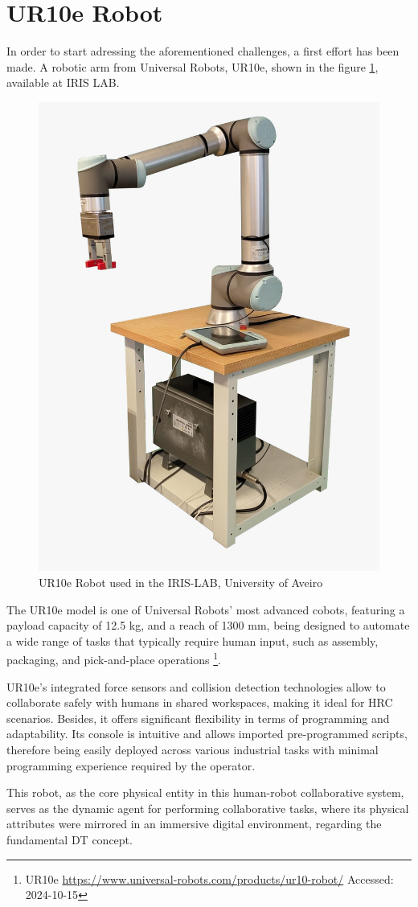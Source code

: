 \section{UR10e Robot}

In order to start adressing the aforementioned challenges, a first effort has been made. A robotic arm from Universal Robots, UR10e, shown in the figure \ref{f:ur10e_iris}, available at IRIS LAB.

\begin{figure}[h]
    \centering
    \includegraphics[width=0.4\linewidth]{figs/ur10e.jpeg}
    \caption{UR10e Robot used in the IRIS-LAB, University of Aveiro}
    \label{f:ur10e_iris}
\end{figure}

The UR10e model is one of Universal Robots' most advanced cobots, featuring a payload capacity of 12.5 kg, and a reach of 1300 mm, being designed to automate a wide range of tasks that typically require human input, such as assembly, packaging, and pick-and-place operations \footnote{UR10e \url{https://www.universal-robots.com/products/ur10-robot/} Accessed: 2024-10-15}.

UR10e's integrated force sensors and collision detection technologies allow to collaborate safely with humans in shared workspaces, making it ideal for \ac{HRC} scenarios. Besides, it offers significant flexibility in terms of programming and adaptability. Its console is intuitive and allows imported pre-programmed scripts, therefore being easily deployed across various industrial tasks with minimal programming experience required by the operator.

This robot, as the core physical entity in this human-robot collaborative system, serves as the dynamic agent for performing collaborative tasks, where its physical attributes were mirrored in an immersive digital environment, regarding the fundamental \ac{DT} concept.

